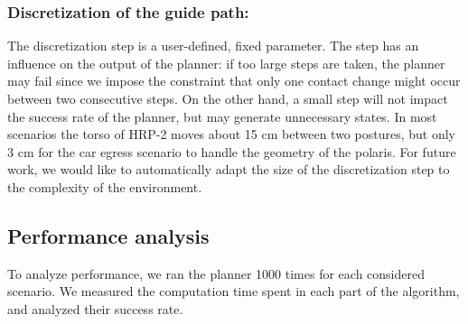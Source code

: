 
\subsubsection{Discretization of the guide path:} \label{sec:disc}
The discretization step is a user-defined, fixed parameter. The step
has an influence on the output of the planner: if too large steps are taken,
the planner may fail since we impose the constraint that only one contact change might occur
between two consecutive steps. On the other hand, a small step will not impact the success rate of the planner, 
but may generate unnecessary states. In most scenarios the torso of HRP-2 moves about 15 cm between two postures, but only 3 cm
for the car egress scenario to handle the geometry of the polaris.
For future work, we would like to automatically adapt the size of the discretization step to the complexity of the environment.

\subsection{Performance analysis} \label{sec:perf}
To analyze performance, we ran the planner 1000 times for each considered scenario.
We measured the computation time spent in each part of the algorithm, and analyzed their success rate.


